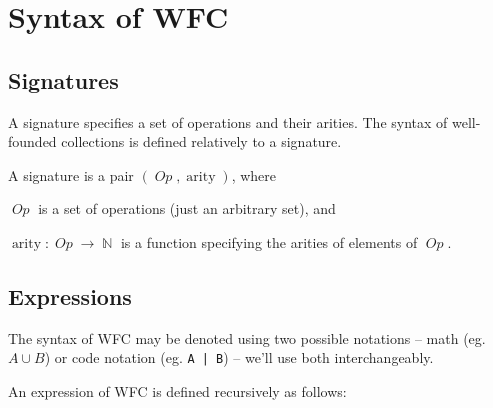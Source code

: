 \documentclass[oneside,12pt]{book}
\theoremstyle{definition}
\theoremstyle{remark}
\newcommand\var[1]{\mathop{\mathit{#1}}\nolimits}
\DeclareMathOperator{\arity}{arity}
\newcommand{\Op}{\var{Op}}
\newcommand{\Nat}{\var{\mathbb{N}}}
\begin{document}
\section{Syntax of WFC}
\subsection{Signatures}
A signature specifies a set of operations and their arities.
The syntax of well-founded collections is defined relatively to a signature.

\begin{defBox}
  A signature is a pair $(\Op, \arity)$, where
  \begin{compactitem}
    \item $\Op$ is a set of operations (just an arbitrary set), and
    \item $\arity\colon \Op \to \Nat$ is a function specifying the arities
      of elements of $\Op$.
  \end{compactitem}
\end{defBox}

\subsection{Expressions}
The syntax of WFC may be denoted using two possible notations -- math
(eg. $A \cup B$) or code notation (eg. \texttt{A | B}) -- we'll use both
interchangeably.

An expression of WFC is defined recursively as follows:
\end{document}
